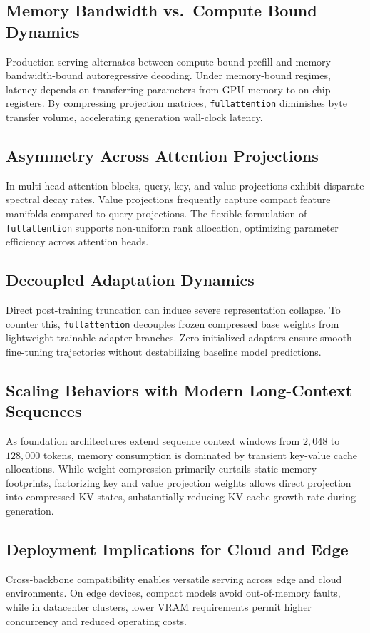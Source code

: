 {\subsection{Memory Bandwidth vs.\ Compute Bound Dynamics}
Production serving alternates between compute-bound prefill and memory-bandwidth-bound autoregressive decoding. Under memory-bound regimes, latency depends on transferring parameters from GPU memory to on-chip registers. By compressing projection matrices, \texttt{fullattention} diminishes byte transfer volume, accelerating generation wall-clock latency.

\subsection{Asymmetry Across Attention Projections}
In multi-head attention blocks, query, key, and value projections exhibit disparate spectral decay rates. Value projections frequently capture compact feature manifolds compared to query projections. The flexible formulation of \texttt{fullattention} supports non-uniform rank allocation, optimizing parameter efficiency across attention heads.

\subsection{Decoupled Adaptation Dynamics}
Direct post-training truncation can induce severe representation collapse. To counter this, \texttt{fullattention} decouples frozen compressed base weights from lightweight trainable adapter branches. Zero-initialized adapters ensure smooth fine-tuning trajectories without destabilizing baseline model predictions.

\subsection{Scaling Behaviors with Modern Long-Context Sequences}
As foundation architectures extend sequence context windows from $2{,}048$ to $128{,}000$ tokens, memory consumption is dominated by transient key-value cache allocations. While weight compression primarily curtails static memory footprints, factorizing key and value projection weights allows direct projection into compressed KV states, substantially reducing KV-cache growth rate during generation.

\subsection{Deployment Implications for Cloud and Edge}
Cross-backbone compatibility enables versatile serving across edge and cloud environments. On edge devices, compact models avoid out-of-memory faults, while in datacenter clusters, lower VRAM requirements permit higher concurrency and reduced operating costs.

}
